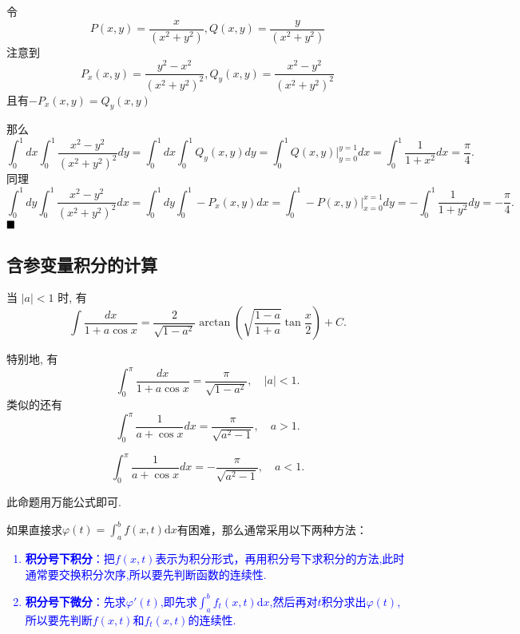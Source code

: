 \documentclass[lang=cn,newtx,10pt,scheme=chinese]{elegantbook}
\begin{document}
\begin{solution}
    令$$P(x,y) = \frac{x}{(x^2 + y^2)}, Q(x,y) = \frac{y}{(x^2 + y^2)}$$ 注意到$$P_x(x,y) = \frac{y^2 - x^2}{(x^2 + y^2)^2}, Q_y(x,y) = \frac{x^2 - y^2}{(x^2 + y^2)^2}$$
    且有$-P_x(x,y) = Q_y(x,y)$

    那么
    $$
    \int_0^1 dx \int_0^1 \frac{x^2 - y^2}{(x^2 + y^2)^2} dy = \int_0^1 dx \int_0^1 Q_y(x,y) dy = \int_0^1 Q(x,y) \bigg|_{y=0}^{y=1} dx = \int_0^1 \frac{1}{1+x^2} dx = \frac{\pi}{4}.
    $$
    同理
    $$
    \int_0^1 dy \int_0^1 \frac{x^2 - y^2}{(x^2 + y^2)^2} dx = \int_0^1 dy \int_0^1 -P_x(x,y) dx = \int_0^1 -P(x,y) \bigg|_{x=0}^{x=1} dy = -\int_0^1 \frac{1}{1+y^2} dy = -\frac{\pi}{4}.
    $$
    $\hfill \blacksquare$
\end{solution}

\subsection{含参变量积分的计算}
\begin{proposition}
当 $|a|<1$ 时, 有
\begin{equation*}
\int \frac{dx}{1+a\cos x} = \frac{2}{\sqrt{1-a^2}} \arctan\left(\sqrt{\frac{1-a}{1+a}}\tan\frac{x}{2}\right) + C. 
\end{equation*}

特别地, 有
\begin{equation*}
\int_{0}^{\pi} \frac{dx}{1+a\cos x} = \frac{\pi}{\sqrt{1-a^2}}, \quad |a|<1. 
\end{equation*}
类似的还有
$$
\int_{0}^{\pi} \frac{1}{a + \cos x} dx = \frac{\pi}{\sqrt{a^2 - 1}}, \quad a > 1.
$$

$$
\int_{0}^{\pi} \frac{1}{a + \cos x} dx =  - \frac{\pi}{\sqrt{a^2 - 1}}, \quad a < 1.
$$
\end{proposition}
\begin{remark}
    此命题用万能公式即可.
\end{remark}

如果直接求$\varphi(t) = \int_{a}^{b}f(x,t) \mathrm d x$有困难，那么通常采用以下两种方法：
\textcolor{blue}{\begin{enumerate}
    \item \textbf{积分号下积分}：把$f(x,t)$表示为积分形式，再用积分号下求积分的方法,此时通常要交换积分次序,所以要先判断函数的连续性.
    \item \textbf{积分号下微分}：先求$\varphi'(t)$,即先求$\int_{a}^{b}f_t(x,t) \mathrm d x$,然后再对$t$积分求出$\varphi(t)$,所以要先判断$f(x,t)$和$f_t(x,t)$的连续性.
\end{enumerate}}
\end{document}
